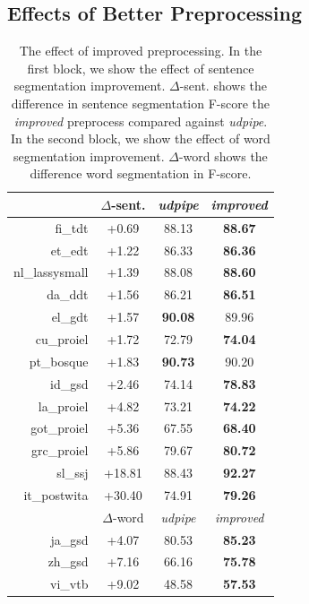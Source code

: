 \documentclass[11pt,a4paper]{article}
\begin{document}
\subsection{Effects of Better Preprocessing}
\begin{table}[t]
  \centering
  \small
  \begin{tabular}{rccc}
     & $\Delta$-sent. & \textit{udpipe} & \textit{improved} \\
    \hline
    fi\_tdt & +0.69 & 88.13 & \textbf{88.67} \\
    et\_edt & +1.22 & 86.33 & \textbf{86.36} \\
    nl\_lassysmall & +1.39 & 88.08 & \textbf{88.60} \\
    da\_ddt & +1.56 & 86.21 & \textbf{86.51} \\
    el\_gdt & +1.57 & \textbf{90.08} & 89.96  \\
    cu\_proiel & +1.72 & 72.79 & \textbf{74.04} \\
    pt\_bosque & +1.83 & \textbf{90.73} & 90.20 \\
    id\_gsd & +2.46 & 74.14 & \textbf{78.83} \\
    la\_proiel & +4.82 & 73.21 & \textbf{74.22} \\
    got\_proiel & +5.36 & 67.55 & \textbf{68.40} \\
    grc\_proiel & +5.86 & 79.67 & \textbf{80.72} \\
    sl\_ssj & +18.81& 88.43 & \textbf{92.27} \\
    it\_postwita & +30.40 &74.91 & \textbf{79.26} \\
    \hline
    \hline
    & $\Delta$-word & \textit{udpipe} & \textit{improved} \\
    ja\_gsd & +4.07 & 80.53 & \textbf{85.23} \\
    zh\_gsd & +7.16 & 66.16 & \textbf{75.78} \\
    vi\_vtb & +9.02 & 48.58 & \textbf{57.53} \\
  \end{tabular}
\caption{The effect of improved preprocessing.
	In the first block, we show the effect of sentence segmentation improvement.
	$\Delta$-sent. shows the difference in sentence segmentation F-score the \textit{improved} preprocess compared against \textit{udpipe}.
	In the second block, we show the effect of word segmentation improvement.
	$\Delta$-word shows the  difference word segmentation in F-score.}\label{tbl:preprocess}
\end{table}
\end{document}

